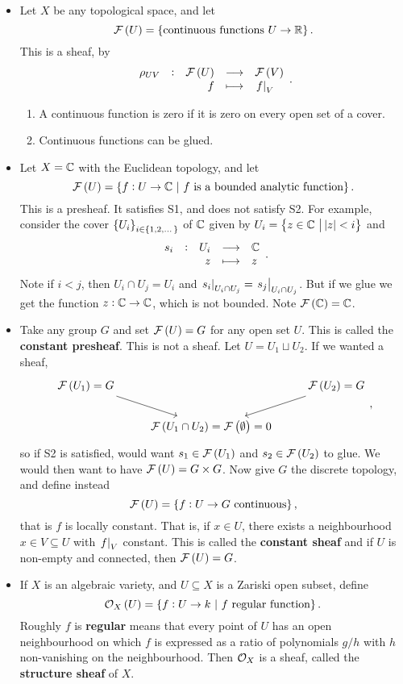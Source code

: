 
\begin{example*}
\hfill
\begin{itemize}
\item Let $ X $ be any topological space, and let
$$ \FFF\br{U} = \cbr{\text{continuous functions} \ U \to \RR}. $$
This is a sheaf, by
$$ \function[\rho_{UV}]{\FFF\br{U}}{\FFF\br{V}}{f}{\eval{f}_V}. $$
\begin{enumerate}[label=S\arabic*.]
\item A continuous function is zero if it is zero on every open set of a cover.
\item Continuous functions can be glued.
\end{enumerate}
\item Let $ X = \mathbb{C} $ with the Euclidean topology, and let
$$ \FFF\br{U} = \cbr{f : U \to \CC \st f \ \text{is a bounded analytic function}}. $$
This is a presheaf. It satisfies S1, and does not satisfy S2. For example, consider the cover $ \cbr{U_i}_{i \in \cbr{1, 2, \dots}} $ of $ \mathbb{C} $ given by $ U_i = \cbr{z \in \CC \st \abs{z} < i} $ and
$$ \function[s_i]{U_i}{\CC}{z}{z}. $$
Note if $ i < j $, then $ U_i \cap U_j = U_i $ and $ \left. s_i \right|_{U_i \cap U_j} = \left. s_j \right|_{U_i \cap U_j} $. But if we glue we get the function $ z : \mathbb{C} \to \mathbb{C} $, which is not bounded. Note $ \FFF\br{\CC} = \CC $.
\item Take any group $ G $ and set $ \FFF\br{U} = G $ for any open set $ U $. This is called the \textbf{constant presheaf}. This is not a sheaf. Let $ U = U_1 \sqcup U_2 $. If we wanted a sheaf,
$$
\begin{tikzcd}
\FFF\br{U_1} = G \arrow{dr} & & \FFF\br{U_2} = G \arrow{dl} \\
& \FFF\br{U_1 \cap U_2} = \FFF\br{\emptyset} = 0 &
\end{tikzcd},
$$
so if S2 is satisfied, would want $ s_1 \in \FFF\br{U_1} $ and $ s_2 \in \FFF\br{U_2} $ to glue. We would then want to have $ \FFF\br{U} = G \times G $. Now give $ G $ the discrete topology, and define instead
$$ \FFF\br{U} = \cbr{f : U \to G \ \text{continuous}}, $$
that is $ f $ is locally constant. That is, if $ x \in U $, there exists a neighbourhood $ x \in V \subseteq U $ with $ \left. f \right|_V $ constant. This is called the \textbf{constant sheaf} and if $ U $ is non-empty and connected, then $ \FFF\br{U} = G $.
\item If $ X $ is an algebraic variety, and $ U \subseteq X $ is a Zariski open subset, define
$$ \OOO_X\br{U} = \cbr{f : U \to k \st f \ \text{regular function}}. $$
Roughly $ f $ is \textbf{regular} means that every point of $ U $ has an open neighbourhood on which $ f $ is expressed as a ratio of polynomials $ g / h $ with $ h $ non-vanishing on the neighbourhood. Then $ \mathcal{O}_X $ is a sheaf, called the \textbf{structure sheaf} of $ X $.
\end{itemize}
\end{example*}

